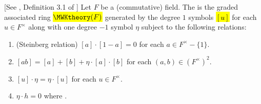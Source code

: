 \begin{definition} \label{definition:milnor_witt_K_theory_of_a_field}
[See \cite{morel_voevodsky_1999}, Definition 3.1 of \cite{morel_a1at}]
Let $F$ be a (commutative) field. The  is the graded associated ring \hl{$\MWKtheory(F)$} generated by the degree $1$ symbols \hl{$[u]$} for each $u \in F^\times$ along with one degree $-1$ symbol $\eta$ subject to the following relations:
\begin{enumerate}
    \item (Steinberg relation) $[a] \cdot [1-a] = 0$ for each $a \in F^\times - \{1\}$.
    \item $[ab] = [a] + [b] + \eta \cdot [a] \cdot [b]$ for each $(a,b) \in (F^\times)^2$. 
    \item $[u] \cdot \eta = \eta \cdot [u]$ for each $u \in F^\times$. 
    \item $\eta \cdot h = 0$ where . 
\end{enumerate}
\end{definition}
